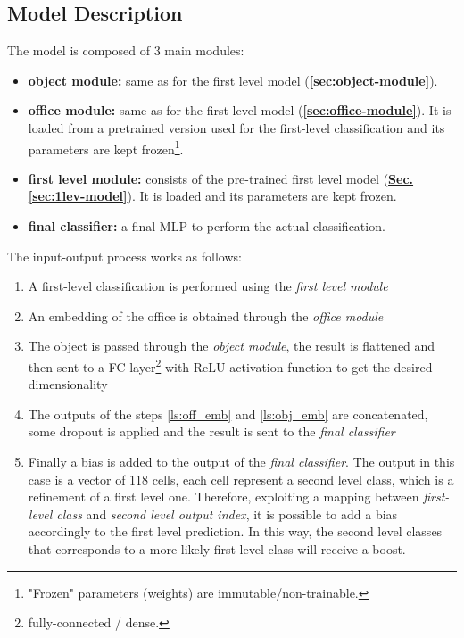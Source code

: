 \documentclass[12pt]{article}
\begin{document}
\subsection{Model Description}\label{sec:sec-lvl-desc}
The model is composed of 3 main modules:
\begin{itemize}
    \item \textbf{object module:} same as for the first level model (\hyperref[sec:object-module]{\textbf{\ref{sec:object-module}}}).
    \item \textbf{office module:} same as for the first level model (\hyperref[sec:office-module]{\textbf{\ref{sec:office-module}}}). It is loaded from a pretrained version used for the first-level classification and its parameters are kept frozen\footnote{\label{ftnote:frozen} "Frozen" parameters (weights) are immutable/non-trainable.}.
    \item \textbf{first level module:} consists of the pre-trained first level model (\hyperref[sec:1lev-model]{\textbf{Sec. \ref{sec:1lev-model}}}). It is loaded and its parameters are kept frozen.
    \item \textbf{final classifier:} a final MLP to perform the actual classification.
\end{itemize}
The input-output process works as follows:
\begin{enumerate}
    \item \label{ls:1lev_cls} A first-level classification is performed using the \textit{first level module}
    \item \label{ls:off_emb} An embedding of the office is obtained through the \textit{office module}
    \item \label{ls:obj_emb} The object is passed through the \textit{object module}, the result is flattened and then sent to a FC layer\footnote{\label{ftnote:fc_layer} fully-connected / dense.} with ReLU activation function to get the desired dimensionality
    \item \label{ls:concat} The outputs of the steps \ref{ls:off_emb} and \ref{ls:obj_emb} are concatenated, some dropout is applied and the result is sent to the \textit{final classifier}
    \item \label{ls:final} Finally a bias is added to the output of the \textit{final classifier}. The output in this case is a vector of 118 cells, each cell represent a second level class, which is a refinement of a first level one. Therefore, exploiting a mapping between \textit{first-level class} and \textit{second level output index}, it is possible to add a bias accordingly to the first level prediction. In this way, the second level classes that corresponds to a more likely first level class will receive a boost.
\end{enumerate}
\end{document}
